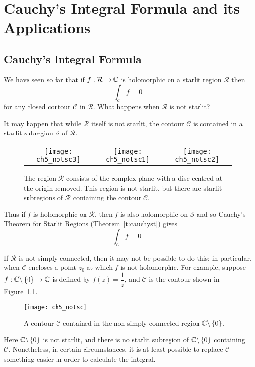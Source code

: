 \newpage
\chapter[Cauchy's Integral Formula]{Cauchy's Integral Formula and its Applications}
\section{Cauchy's Integral Formula}
We have seen so far that if $f:\mathcal{R} \to \mathbb{C}$ is holomorphic on a starlit region $\mathcal{R}$ then
\[
\int_{\mathcal{C}} f = 0
\]
for any closed contour $\mathcal{C}$ in $\mathcal{R}$. What happens when $\mathcal{R}$ is not starlit?  

It may happen that while $\mathcal{R}$ itself is not starlit, the contour $\mathcal{C}$ is contained in a starlit subregion $\mathcal{S}$ of $\mathcal{R}$.

\begin{figure}[H]
\begin{tabular}{ccc}
\texttt{[image: ch5\_notsc3]} & \quad \texttt{[image: ch5\_notsc1]} \quad & \texttt{[image: ch5\_notsc2]}
\end{tabular}
\caption{The region $\mathcal{R}$ consists of the complex plane with a disc centred at the origin removed.  This region is not starlit, but there are starlit subregions of $\mathcal{R}$ containing the contour $\mathcal{C}$.}
\end{figure}

Thus if $f$ is holomorphic on $\mathcal{R}$, then $f$ is also holomorphic on $\mathcal{S}$ and so Cauchy's Theorem for Starlit Regions (Theorem~\ref{t:cauchyst}) gives
\[
\int_{\mathcal{C}} f=0.
\]

If $\mathcal{R}$ is not simply connected, then it may not be possible to do this; in particular, when $\mathcal{C}$ encloses a point $z_0$ at which $f$ is not holomorphic.  For example, suppose $f:\mathbb{C} \backslash \left\{0\right\} \to \mathbb{C}$ is defined by $f(z) = \dfrac{1}{z}$, and $\mathcal{C}$ is the contour shown in Figure~\ref{f:notsc}.  
\begin{figure}[H]
\centering
\texttt{[image: ch5\_notsc]}
\caption{A contour $\mathcal{C}$ contained in the non-simply connected region $\mathbb{C}\backslash \left\{0\right\}$.}
\label{f:notsc}
\end{figure}

Here $\mathbb{C} \backslash \left\{0\right\}$ is not starlit, and there is no starlit subregion of $\mathbb{C} \backslash \left\{0\right\}$ containing $\mathcal{C}$.  Nonetheless, in certain circumstances, it is at least possible to replace $\mathcal{C}$ something easier in order to calculate the integral.

